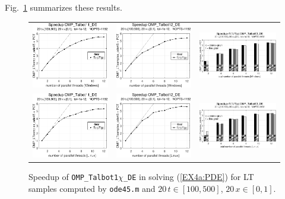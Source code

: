 \documentclass[a4paper,10pt]{report}%
\begin{document}
Fig.~\ref{PAR_EX4a_speedup_ode452} summarizes these results.
\begin{figure}[htb]
\centering
\begin{tabular}{ccc} %
\includegraphics[height=0.2\textwidth]{./FIGS/EX4a/EX4a_ode45_speedup_11_20t_100_Windows.eps} &
\includegraphics[height=0.2\textwidth]{./FIGS/EX4a/EX4a_ode45_speedup_12_20t_100_Windows.eps} &
\includegraphics[height=0.2\textwidth,keepaspectratio=true]{./FIGS/EX4a/EX4a_ode45_speedup_13_20t_100_Windows.eps} \\
\includegraphics[height=0.2\textwidth]{./FIGS/EX4a/EX4a_ode45_speedup_11_20t_100_Linux.eps} &
\includegraphics[height=0.2\textwidth]{./FIGS/EX4a/EX4a_ode45_speedup_12_20t_100_Linux.eps} &
\includegraphics[height=0.2\textwidth,keepaspectratio=true]{./FIGS/EX4a/EX4a_ode45_speedup_13_20t_100_Linux.eps}
\end{tabular}
\caption{\small Speedup of {\tt OMP\_Talbot1$\chi$\_DE} in solving (\ref{EX4a:PDE}) for LT samples
computed by {\tt ode45.m} and $20\,t\in[100,500]$, $20\,x\in[0,1]$.}
\label{PAR_EX4a_speedup_ode452}
\end{figure}
\end{document}
